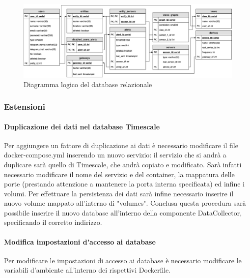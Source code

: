 			\begin{landscape}
			\begin{figure}[H]
				\centering
				\includegraphics[scale=0.600]{res/images/DATABASE/ER_Modificato.png}
				\caption{Diagramma logico del database relazionale}
				\label{Diagramma 9}
			\end{figure}
			\end{landscape}
	\subsubsection{Estensioni}
		\paragraph{Duplicazione dei dati nel database Timescale}
			Per aggiungere un fattore di duplicazione ai dati è necessario modificare il file docker-compose.yml inserendo un nuovo servizio: il servizio che si andrà a duplicare sarà quello di Timescale, che andrà copiato e modificato.
			Sarà infatti necessario modificare il nome del servizio e del container, la mappatura delle porte (prestando attenzione a mantenere la porta interna specificata) ed infine i volumi. Per effettuare la persistenza dei dati sarà infine necessario inserire il nuovo volume mappato all'interno di "volumes".
			Conclusa questa procedura sarà possibile inserire il nuovo database all'interno della componente DataCollector, specificando il corretto indirizzo.

		\paragraph{Modifica impostazioni d'accesso ai database}	
			Per modificare le impostazioni di accesso ai database è necessario modificare le variabili d'ambiente all'interno dei rispettivi Dockerfile.		